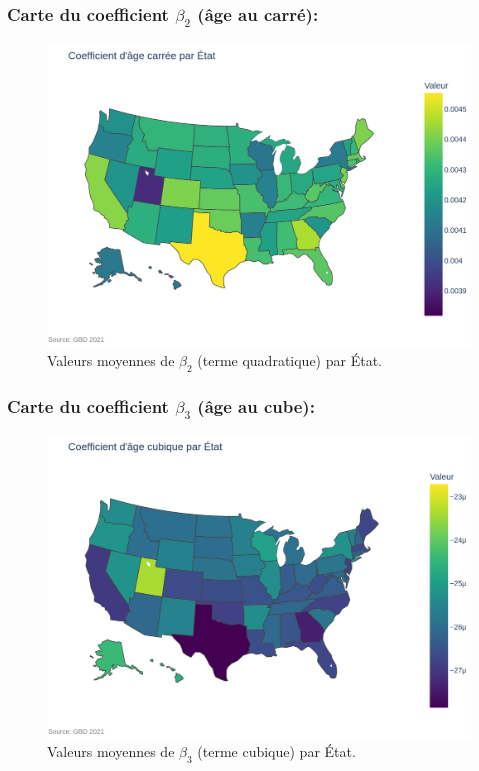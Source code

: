 \subsubsection{Carte du coefficient \(\beta_2\) (âge au carré):}

\begin{figure}[H]
	\centering
	\includegraphics[width=1\textwidth]{images/map_age2.png}
	\caption{Valeurs moyennes de \(\beta_2\) (terme quadratique) par État.}
\end{figure}

\subsubsection{Carte du coefficient \(\beta_3\) (âge au cube):}

\begin{figure}[H]
	\centering
	\includegraphics[width=1\textwidth]{images/map_age3.png}
	\caption{Valeurs moyennes de \(\beta_3\) (terme cubique) par État.}
\end{figure}

